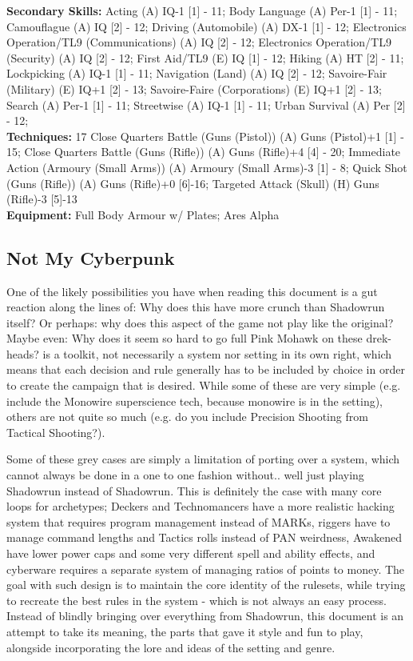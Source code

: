 \begin{multicols}{2}
	\textbf{Secondary Skills: }
	Acting (A) IQ-1 [1] - 11; Body Language (A) Per-1 [1] - 11;  Camouflague (A) IQ [2] - 12; Driving (Automobile) (A) DX-1 [1] - 12; Electronics Operation/TL9 (Communications) (A) IQ [2] - 12; Electronics Operation/TL9 (Security) (A) IQ [2] - 12; First Aid/TL9 (E) IQ [1] - 12; Hiking (A) HT [2] - 11; Lockpicking (A) IQ-1 [1] - 11; Navigation (Land) (A) IQ [2] - 12; Savoire-Fair (Military) (E) IQ+1 [2] - 13; Savoire-Faire (Corporations) (E) IQ+1 [2] - 13; Search (A) Per-1 [1] - 11; Streetwise (A) IQ-1 [1] - 11; Urban Survival (A) Per [2] - 12;\\
	
	\textbf{Techniques: } 17
	Close Quarters Battle (Guns (Pistol)) (A) Guns (Pistol)+1 [1] - 15; Close Quarters Battle (Guns (Rifle)) (A) Guns (Rifle)+4 [4] - 20; Immediate Action (Armoury (Small Arms)) (A) Armoury (Small Arms)-3 [1] - 8; Quick Shot (Guns (Rifle)) (A) Guns (Rifle)+0 [6]-16; Targeted Attack (Skull) (H) Guns (Rifle)-3 [5]-13\\
	
	\textbf{Equipment: }
	Full Body Armour w/ Plates; Ares Alpha
	
	\subsection{Not My Cyberpunk}
	
	One of the likely possibilities you have when reading this document is a gut reaction along the lines of: Why does this have more crunch than Shadowrun itself? Or perhaps: why does this aspect of the game not play like the original? Maybe even: Why does it seem so hard to go full Pink Mohawk on these drek-heads? \GURPS is a toolkit, not necessarily a system nor setting in its own right, which means that each decision and rule generally has to be included by choice in order to create the campaign that is desired. While some of these are very simple (e.g. include the Monowire superscience tech, because monowire is in the setting), others are not quite so much (e.g. do you include Precision Shooting from Tactical Shooting?).
	
	Some of these grey cases are simply a limitation of porting over a system, which cannot always be done in a one to one fashion without.. well just playing Shadowrun instead of \GURPS Shadowrun. This is definitely the case with many core loops for archetypes; Deckers and Technomancers have a more realistic hacking system that requires program management instead of MARKs, riggers have to manage command lengths and Tactics rolls instead of PAN weirdness, Awakened have lower power caps and some very different spell and ability effects, and cyberware requires a separate system of managing ratios of points to money. The goal with such design is to maintain the core identity of the rulesets, while trying to recreate the best rules in the \GURPS system - which is not always an easy process. Instead of blindly bringing over everything from Shadowrun, this document is an attempt to take its meaning, the parts that gave it style and fun to play, alongside incorporating the lore and ideas of the setting and genre.
	

\end{multicols}
